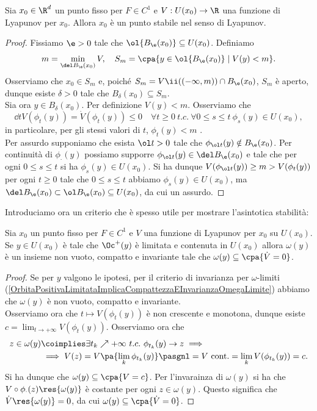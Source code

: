 \begin{theorem}\label{TeoremaLyapunov1Stabilita}
Sia $x_0\in\R^d$ un punto fisso per $F\in C^1$ e $V:U(x_0)\to\R$ una funzione di Lyapunov per $x_0$. Allora $x_0$ \`e un punto stabile nel senso di Lyapunov.
\end{theorem}
\begin{proof}
Fissiamo $\e>0$ tale che $\ol{B_\e(x_0)}\subseteq U(x_0)$. Definiamo \[m=\min_{\del B_\e(x_0)}V,\quad S_m=\cpa{y\in\ol{B_\e(x_0)}\mid V(y)< m}.\]
Osserviamo che $x_0\in S_m$ e, poich\'e $S_m=V\ii((-\infty,m))\cap B_\e(x_0)$, $S_m$ \`e aperto, dunque esiste $\delta>0$ tale che $B_\delta(x_0)\subseteq S_m$.\\
Sia ora $y\in B_\delta(x_0)$. Per definizione $V(y)< m$. Osserviamo che
\[\dd t{}V(\phi_t(y))=\dot V(\phi_t(y))\leq 0 \quad \forall t\geq 0\ t.c.\ \forall 0\leq s\leq t\ \phi_s(y)\in U(x_0),\]
in particolare, per gli stessi valori di $t$, $\phi_t(y)< m$ .\\
Per assurdo supponiamo che esista $\ol t>0$ tale che $\phi_{\ol t}(y)\notin B_\e(x_0)$. Per continuit\`a di $\phi_\cdot(y)$ possiamo supporre $\phi_{\ol t}(y)\in \del B_\e(x_0)$ e tale che per ogni $0\leq s\leq t$ si ha $\phi_s(y)\in U(x_0)$. Si ha dunque $V(\phi_{\ol t}(y))\geq m>V(\phi_t(y))$ per ogni $t\geq 0$ tale che $0\leq s\leq t$ abbiamo $\phi_s(y)\in U(x_0)$, ma $\del B_\e(x_0)\subset\ol B_\e(x_0)\subseteq U(x_0)$, da cui un assurdo.
\end{proof}

\noindent Introduciamo ora un criterio che \`e spesso utile per mostrare l'asintotica stabilit\`a:
\begin{proposition}\label{CriterioLaSalle}
Sia $x_0$ un punto fisso per $F\in C^1$ e $V$ una funzione di Lyapunov per $x_0$ su $U(x_0)$. Se $y\in U(x_0)$ \`e tale che $\Oc^+(y)$ \`e limitata e contenuta in $U(x_0)$ allora $\omega(y)$ \`e un insieme non vuoto, compatto e invariante tale che $\omega(y)\subseteq \cpa{\dot V=0}$.
\end{proposition}
\begin{proof}
Se per $y$ valgono le ipotesi, per il criterio di invarianza per $\omega$-limiti (\ref{OrbitaPositivaLimitataImplicaCompattezzaEInvarianzaOmegaLimite}) abbiamo che $\omega(y)$ \`e non vuoto, compatto e invariante.\\
Osserviamo ora che $t\mapsto V(\phi_t(y))$ \`e non crescente e monotona, dunque esiste $\displaystyle c=\lim_{t\to+\infty}V(\phi_t(y))$. Osserviamo ora che
\begin{align*}
z\in \omega(y)&\coimplies \exists t_k\nearrow +\infty \ t.c.\ \phi_{t_k}(y)\to z\implies\\
&\implies V(z)=V\pa{\lim_{k}\phi_{t_k}(y)}\pasgnl={V\text{ cont.}}=\lim_k V(\phi_{t_k}(y))=c.
\end{align*}
Si ha dunque che $\omega(y)\subseteq \cpa{V=c}$. Per l'invarainza di $\omega(y)$ si ha che $V\circ \phi_\cdot(z)\res{\omega(y)}$ \`e costante per ogni $z\in\omega(y)$. Questo significa che $\dot V\res{\omega(y)}=0$, da cui $\omega(y)\subseteq \cpa{\dot V=0}$.
\end{proof}

